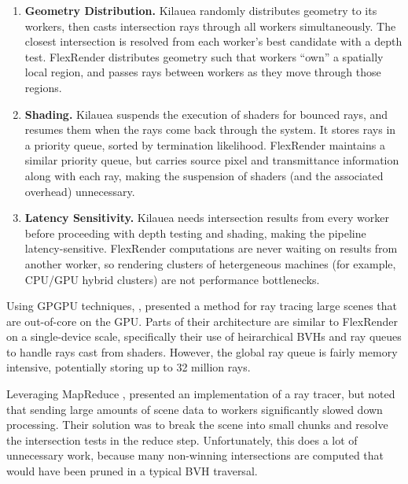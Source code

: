 \documentclass[a4paper,twoside]{article}
\begin{document}
\begin{enumerate}
    \item \textbf{Geometry Distribution.}
        Kilauea randomly distributes geometry to its workers, then casts
        intersection rays through all workers simultaneously. The closest
        intersection is resolved from each worker's best candidate with a
        depth test. FlexRender distributes geometry such that workers ``own''
        a spatially local region, and passes rays between workers as they move
        through those regions.

    \item \textbf{Shading.}
        Kilauea suspends the execution of shaders for bounced rays, and resumes
        them when the rays come back through the system. It stores rays in a
        priority queue, sorted by termination likelihood. FlexRender maintains
        a similar priority queue, but carries source pixel and transmittance
        information along with each ray, making the suspension of shaders (and
        the associated overhead) unnecessary.

    \item \textbf{Latency Sensitivity.}
        Kilauea needs intersection results from every worker before proceeding
        with depth testing and shading, making the pipeline latency-sensitive.
        FlexRender computations are never waiting on results from another worker,
        so rendering clusters of hetergeneous machines (for example, CPU/GPU
        hybrid clusters) are not performance bottlenecks.
\end{enumerate}

Using GPGPU techniques, \cite{garanzha:2011:ray}, presented a
method for ray tracing large scenes that are out-of-core on the GPU. Parts of
their architecture are similar to FlexRender on a single-device scale,
specifically their use of heirarchical BVHs and ray queues to handle rays cast
from shaders. However, the global ray queue is fairly memory intensive,
potentially storing up to 32 million rays.

Leveraging MapReduce \cite{dean:2004}, \cite{northam:2011} presented an
implementation of a ray tracer, but noted that sending large amounts of scene
data to workers significantly slowed down processing. Their solution was to
break the scene into small chunks and resolve the intersection tests in the
reduce step. Unfortunately, this does a lot of unnecessary work, because many
non-winning intersections are computed that would have been pruned in a typical
BVH traversal.
\end{document}
